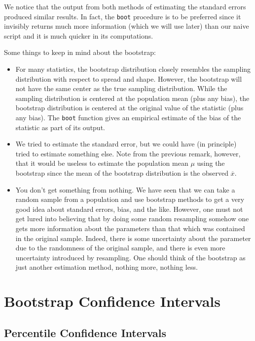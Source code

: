 \documentclass[captions=tableheading]{scrbook}
\begin{document}
We notice that the output from both methods of estimating the standard errors produced similar results. In fact, the \texttt{boot} procedure is to be preferred since it invisibly returns much more information (which we will use later) than our naive script and it is much quicker in its computations.

\begin{rem}
Some things to keep in mind about the bootstrap:

\begin{itemize}
\item For many statistics, the bootstrap distribution closely resembles the sampling distribution with respect to spread and shape. However, the bootstrap will not have the same center as the true sampling distribution. While the sampling distribution is centered at the population mean (plus any bias), the bootstrap distribution is centered at the original value of the statistic (plus any bias). The \texttt{boot} function gives an empirical estimate of the bias of the statistic as part of its output.
\item We tried to estimate the standard error, but we could have (in principle) tried to estimate something else. Note from the previous remark, however, that it would be useless to estimate the population mean \(\mu\) using the bootstrap since the mean of the bootstrap distribution is the observed \(\overline{x}\).
\item You don't get something from nothing. We have seen that we can take a random sample from a population and use bootstrap methods to get a very good idea about standard errors, bias, and the like. However, one must not get lured into believing that by doing some random resampling somehow one gets more information about the parameters than that which was contained in the original sample. Indeed, there is some uncertainty about the parameter due to the randomness of the original sample, and there is even more uncertainty introduced by resampling. One should think of the bootstrap as just another estimation method, nothing more, nothing less.
\end{itemize}

\end{rem}
\section{Bootstrap Confidence Intervals}
\label{sec-13-3}
\label{sec-Bootstrap-Confidence-Intervals}
\subsection{Percentile Confidence Intervals}
\label{sec-13-3-1}
\end{document}
